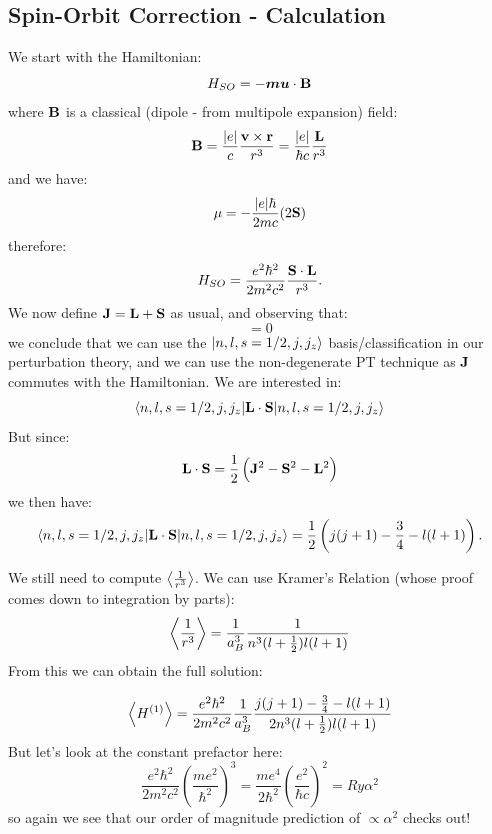 \subsection{Spin-Orbit Correction - Calculation}
We start with the Hamiltonian:
\begin{equation}
    H_{SO} = -\mbox{\boldmath$ mu $} \cdot \mathbf{B}
\end{equation}
where $\mathbf{B}$ is a classical (dipole - from multipole expansion) field:
\begin{equation}
    \mathbf{B} = \frac{\lvert e \rvert}{c}\frac{\mathbf{v} \times \mathbf{r}}{r^3} = \frac{\lvert e \rvert}{\hbar c}\frac{\mathbf{L}}{r^3}
\end{equation}
and we have:
\begin{equation}
    \mu = -\frac{\lvert e \rvert\hbar}{2mc}(2\mathbf{S})
\end{equation}
therefore:
\begin{equation}
    H_{SO} = \frac{e^2\hbar^2}{2m^2c^2}\frac{\mathbf{S} \cdot \mathbf{L}}{r^3}.
\end{equation}
We now define $\mathbf{J} = \mathbf{L} + \mathbf{S}$ as usual, and observing that:
\begin{equation}
    [H_{SO}, \v{J}_i] = 0
\end{equation}
we conclude that we can use the $\lvert n, l, s=1/2, j, j_z \rangle$ basis/classification in our perturbation theory, and we can use the non-degenerate PT technique as $\mathbf{J}$ commutes with the Hamiltonian. We are interested in:
\begin{equation}
    \langle n,l,s=1/2, j, j_z \rvert\mathbf{L} \cdot \mathbf{S}\lvert n,l,s=1/2, j, j_z \rangle
\end{equation}
But since:
\begin{equation}
    \mathbf{L}\cdot \mathbf{S} = \frac{1}{2}\left(\mathbf{J}^2 - \mathbf{S}^2 - \mathbf{L}^2\right)
\end{equation}
we then have:
\begin{equation}
    \langle n,l,s=1/2, j, j_z \rvert\mathbf{L} \cdot \mathbf{S}\lvert n,l,s=1/2, j, j_z \rangle = \frac{1}{2}\left(j(j+1) - \frac{3}{4} - l(l+1)\right).
\end{equation}

We still need to compute $\left< \frac{1}{r^3} \right>$. We can use Kramer's Relation (whose proof comes down to integration by parts):
\begin{equation}
    \left< \frac{1}{r^3} \right> = \frac{1}{a_B^3}\frac{1}{n^3(l + \frac{1}{2})l(l+1)}
\end{equation}
From this we can obtain the full solution:

\begin{equation}
    \left< H^{(1)} \right> = \frac{e^2\hbar^2}{2m^2c^2}\frac{1}{a_B^3}\frac{j(j+1) - \frac{3}{4} - l(l+1)}{2n^3(l + \frac{1}{2})l(l+1)}
\end{equation}
But let's look at the constant prefactor here:
\begin{equation}
    \frac{e^2\hbar^2}{2m^2c^2}\left(\frac{me^2}{\hbar^2}\right)^3 = \frac{me^4}{2\hbar^2}\left(\frac{e^2}{\hbar c}\right)^2 = \si{Ry}\alpha^2
\end{equation}
so again we see that our order of magnitude prediction of $\propto \alpha^2$ checks out!

